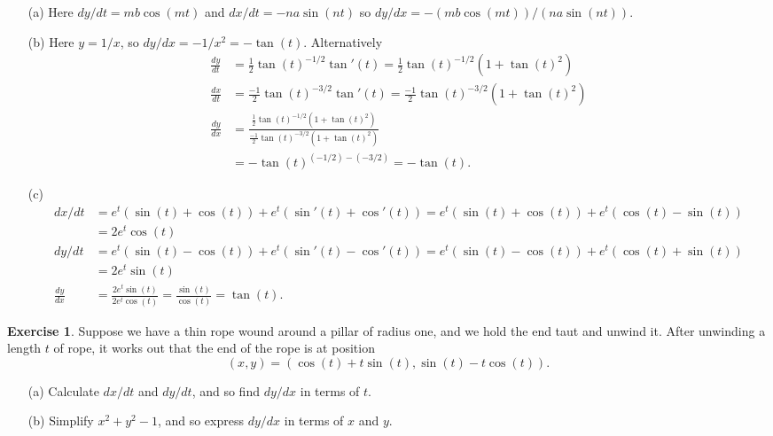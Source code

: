 \documentclass[a4paper]{amsart}
\theoremstyle{definition}
\newtheorem{exercise}{Exercise}[section]
\newenvironment{solution}{{\noindent \bf Solution:}}{}
\begin{document}
\begin{solution}
\begin{itemize}
  \item[(a)] Here $dy/dt=mb\cos(mt)$ and $dx/dt=-na\sin(nt)$
   so $dy/dx=-(mb\cos(mt))/(na\sin(nt))$.
  \item[(b)] Here $y=1/x$, so $dy/dx=-1/x^2=-\tan(t)$.
   Alternatively 
   \begin{align*}
    \frac{dy}{dt} &= \frac{1}{2}\tan(t)^{-1/2}\tan'(t) 
                   = \frac{1}{2}\tan(t)^{-1/2}(1+\tan(t)^2) \\
    \frac{dx}{dt} &= \frac{-1}{2}\tan(t)^{-3/2}\tan'(t) 
                   = \frac{-1}{2}\tan(t)^{-3/2}(1+\tan(t)^2) \\
    \frac{dy}{dx} &= \frac{
                      \frac{1}{2}\tan(t)^{-1/2}(1+\tan(t)^2)
                     }{
                      \frac{-1}{2}\tan(t)^{-3/2}(1+\tan(t)^2)
                     } \\
                  &= -\tan(t)^{(-1/2)-(-3/2)} = -\tan(t).
   \end{align*}
  \item[(c)] 
   \begin{align*}
    dx/dt
     &= e^t(\sin(t)+\cos(t)) + e^t(\sin'(t)+\cos'(t)) 
      = e^t(\sin(t)+\cos(t)) + e^t(\cos(t)-\sin(t)) \\
     &= 2e^t\cos(t) \\
    dy/dt
     &= e^t(\sin(t)-\cos(t)) + e^t(\sin'(t)-\cos'(t)) 
      = e^t(\sin(t)-\cos(t)) + e^t(\cos(t)+\sin(t)) \\
     &= 2e^t\sin(t) \\
    \frac{dy}{dx} &= \frac{2e^t\sin(t)}{2e^t\cos(t)} 
      = \frac{\sin(t)}{\cos(t)} = \tan(t).
   \end{align*}
 \end{itemize}
\end{solution}
\begin{exercise}\label{ex-unwind}
Suppose we have a thin rope wound around a pillar of radius
 one, and we hold the end taut and unwind it.  After
 unwinding a length $t$ of rope, it works out that the end
 of the rope is at position 
 \[ (x,y) = (\cos(t) + t\sin(t),\sin(t)-t\cos(t)). \]
 \begin{itemize}
  \item[(a)] Calculate $dx/dt$ and $dy/dt$, and so find
   $dy/dx$ in terms of $t$. 
  \item[(b)] Simplify $x^2+y^2-1$, and so express $dy/dx$ in
   terms of $x$ and $y$.
 \end{itemize}
\end{exercise}
\end{document}
